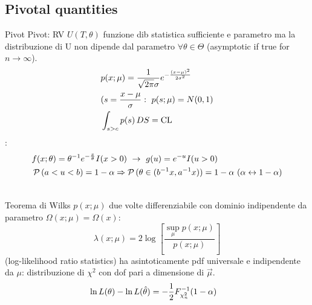 \subsection{Pivotal quantities}

\begin{frame}{Pivot}
Pivot: RV $U(T,\theta)$ funzione dib statistica sufficiente e parametro ma la distribuzione di U non dipende dal parametro $\forall \theta\in\Theta$ (asymptotic if true for $n\to\infty$).
\begin{align*}
&p(x;\mu)=\frac{1}{\sqrt{2\pi}\sigma}e^{-\frac{(x-\mu)^2}{2\sigma^2}}\\
&(s=\frac{x-\mu}{\sigma}:\ p(s;\mu)=N(0,1)\\
&\int_{s>c}p(s)\,DS=\operatorname{CL}{}
\end{align*}
:
\begin{align*}
&f(x;\theta)=\invers{\theta}\exp{-\frac{x}{\theta}}I(x>0)\ \to\ g(u)=\exp{-u}I(u>0)\\
&\prob{(a<u<b)}=1-\alpha\Rightarrow\prob{(\theta\in(\invers{b}x,\invers{a}x))}=1-\alpha\ (\alpha\leftrightarrow1-\alpha)\\
&
\end{align*}
\end{frame}

\begin{frame}{Teorema di Wilks}
$p(x;\mu)$ due volte differenziabile con dominio indipendente da parametro $\Omega(x;\mu)=\Omega(x)$: \[\lambda(x;\mu)=2\log{[\frac{\sup_{\mu}{p(x;\mu)}}{p(x;\mu)}]}\] (log-likelihood ratio statistics) ha asintoticamente pdf universale e indipendente da $\mu$: distribuzione di $\chi^2$ con dof pari a dimensione di $\vec{\mu}$.
\begin{align*}
&\ln{L(\theta)}-\ln{L(\hat{\theta})}=-\frac{1}{2}{F}^{-1}_{\chi_n^2}(1-\alpha)
\end{align*}
\end{frame}

